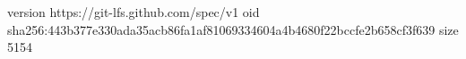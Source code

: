 version https://git-lfs.github.com/spec/v1
oid sha256:443b377e330ada35acb86fa1af81069334604a4b4680f22bccfe2b658cf3f639
size 5154
